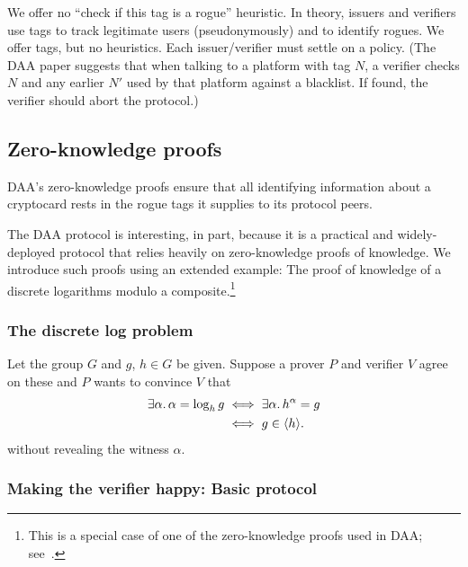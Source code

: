 We offer no “check if this tag is a rogue” heuristic. In
theory, issuers and verifiers use tags to track legitimate
users (pseudonymously) and to identify rogues. We offer tags,
but no heuristics. Each issuer/verifier must settle on a
policy. (The DAA paper suggests that when talking to a
platform with tag $N$, a verifier checks $N$ and any earlier $N'$
used by that platform against a blacklist. If found, the
verifier should abort the protocol.)

\subsection{Zero-knowledge proofs}

\begin{comment}
	\emph{PDS:}
	Security property:  Unforgeability (by reduction to the
	flexible RSA problem).

	Alleged security properties: Satistical witness
	indistinguishable and soundness (by reduction to the flexible
	RSA problem in the random oracle model).
\end{comment}
\fi

DAA's zero-knowledge proofs ensure that all identifying information
about a cryptocard rests in the rogue tags it supplies to its protocol peers.

The DAA protocol is interesting, in part, because it is a practical
and widely-deployed protocol that relies heavily on zero-knowledge
proofs of knowledge.
We introduce such proofs using an extended example: The
proof of knowledge of a discrete logarithms modulo a
composite.\footnote{%
	This is a special case of one of the zero-knowledge proofs used in DAA;
	see~\cite[Appendix~A]{daa:full}.}

\subsubsection{The discrete log problem}

Let the group $G$ and $g$, $h \in G$ be given.
Suppose a prover $P$ and
verifier $V$ agree on these and $P$ wants to convince $V$ that
\begin{align*}
\exists \alpha.\, \alpha = \log_h g &\iff \exists \alpha.\, h^\alpha = g \\
	&\iff g \in \langle{h}\rangle.
\end{align*}
without revealing the witness $\alpha$.

\subsubsection{Making the verifier happy: Basic protocol}

